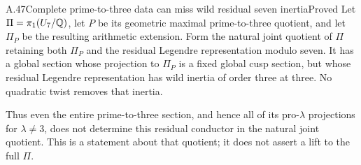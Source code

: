 \begin{statement}{A.47}{Complete prime-to-three data can miss wild residual seven inertia}{Proved}
Let $\Pi=\pi_1(U_7/\mathbb Q)$, let $P$ be its geometric maximal prime-to-three
quotient, and let $\Pi_P$ be the resulting arithmetic extension. Form the
natural joint quotient of $\Pi$ retaining both $\Pi_P$ and the residual
Legendre representation modulo seven. It has a global section whose
projection to $\Pi_P$ is a fixed global cusp section, but whose residual
Legendre representation has wild inertia of order three at three.
No quadratic twist removes that inertia.

Thus even the entire prime-to-three section, and hence all of its
pro-$\lambda$ projections for $\lambda\ne3$, does not determine this
residual conductor in the natural joint quotient. This is a statement
about that quotient; it does not assert a lift to the full $\Pi$.
\end{statement}
